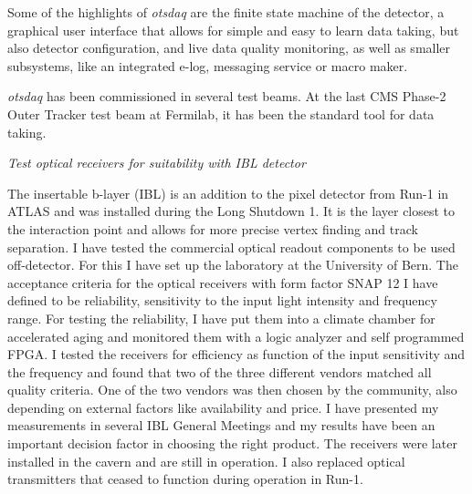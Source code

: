\documentclass[]{cv} %
\begin{document}
\begin{statement}
Some of the highlights of \textit{otsdaq} are the finite state machine of the
detector, a graphical user interface that allows for simple and easy to learn
data taking, but also detector configuration, and live data quality monitoring,
as well as smaller subsystems, like an integrated e-log, messaging service or
macro maker.

\textit{otsdaq} has been commissioned in several test beams. At the last CMS
Phase-2 Outer Tracker test beam at Fermilab, it has been the standard tool for
data taking.

\vspace{15pt}
\Large{}
\textit{Test optical receivers for suitability with IBL detector}
\normalsize{}

The insertable b-layer (IBL) is an addition to the pixel detector from Run-1 in
ATLAS and was installed during the Long Shutdown 1. It is the layer closest to
the interaction point and allows for more precise vertex finding and track
separation. I have tested the commercial optical readout components to be used
off-detector. For this I have set up the laboratory at the University of Bern.
The acceptance criteria for the optical receivers with form factor SNAP 12 I
have defined to be reliability, sensitivity to the input light intensity and
frequency range. For testing the reliability, I have put them into a climate
chamber for accelerated aging and monitored them with a logic analyzer and self
programmed FPGA. I tested the receivers for efficiency as function of the input
sensitivity and the frequency and found that two of the three different vendors
matched all quality criteria. One of the two vendors was then chosen by the
community, also depending on external factors like availability and price. I
have presented my measurements in several IBL General Meetings and my results
have been an important decision factor in choosing the right product. The
receivers were later installed in the cavern and are still in operation. I also
replaced optical transmitters that ceased to function during operation in Run-1.

\end{statement}
\fi
\end{document}

